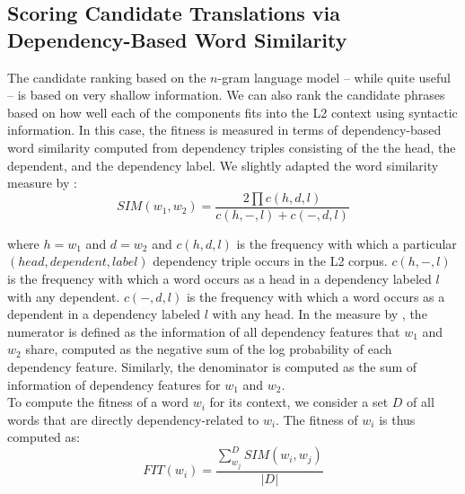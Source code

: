 \documentclass[11pt]{article}
\begin{document}
\subsection{Scoring Candidate Translations via Dependency-Based Word Similarity}
\label{sec:dependencySIM}
The candidate ranking based on the $n$-gram language model -- while quite useful
-- is based on very
shallow information. We can also rank the candidate phrases based on how well
each of the components fits into the L2 context using syntactic information.
In this case, the fitness is measured in terms of dependency-based word
similarity computed from dependency triples consisting of the the head, the
dependent, and the dependency label. We slightly adapted the word similarity
measure by :
\begin{equation}
SIM(w_1,w_2) = \frac{2 \prod c(h,d,l)} 
{c(h,-,l) + c(-,d,l)}
\end{equation}

\noindent
where $h=w_1$ and $d=w_2$ and 
$c(h,d,l)$ is the frequency with which a particular $(head, dependent, label)$
dependency triple occurs in the L2 corpus.
$c(h,-,l)$ is the frequency with which a word occurs as a head in a dependency
labeled $l$ with any dependent. $c(-,d,l)$ is the frequency with which a word
occurs as a dependent in a dependency labeled $l$  with any head. 
In the  measure by , the numerator is defined as the information of all dependency features that $w_1$ and $w_2$ share, computed as the negative sum of the log probability of each dependency feature. Similarly, the denominator is computed as the sum of information of dependency features for $w_1$ and $w_2$. \\

To compute the fitness of a word $w_i$ for its context, we consider a set $D$ of all words that are directly dependency-related to $w_i$. The fitness of $w_i$ is thus computed as:\\
\begin{equation}
FIT(w_i) =  \frac {  \sum_{w_j}^{D} SIM(w_i,w_j) } {  |D|}
\end{equation}
\end{document}
